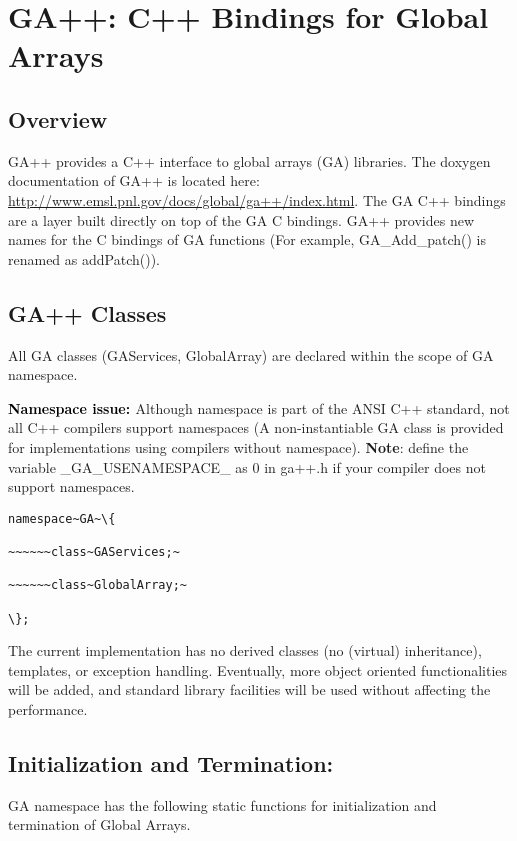 \chapter{GA++: C++ Bindings for Global Arrays}

\section{Overview }

GA++ provides a C++ interface to global arrays (GA) libraries. The
doxygen documentation of GA++ is located here: \href{http://www.emsl.pnl.gov/docs/global/ga++/index.html}{http://www.emsl.pnl.gov/docs/global/ga++/index.html}.
The GA C++ bindings are a layer built directly on top of the GA C
bindings. GA++ provides new names for the C bindings of GA functions
(For example, GA\_Add\_patch() is renamed as addPatch()). 


\section{GA++ Classes }

All GA classes (GAServices, GlobalArray) are declared within the scope
of GA namespace.

\textbf{\textcolor{black}{Namespace issue: }}Although namespace is
part of the ANSI C++ standard, not all C++ compilers support namespaces
(A non-instantiable GA class is provided for implementations using
compilers without namespace). \textbf{Note}: define the variable \_GA\_USENAMESPACE\_
as 0 in ga++.h if your compiler does not support namespaces. 
\begin{verbatim}
namespace~GA~\{

~~~~~~class~GAServices;~

~~~~~~class~GlobalArray;~

\};
\end{verbatim}
The current implementation has no derived classes (no (virtual) inheritance),
templates, or exception handling. Eventually, more object oriented
functionalities will be added, and standard library facilities will
be used without affecting the performance. 


\section{Initialization and Termination: }

GA namespace has the following static functions for initialization
and termination of Global Arrays.

